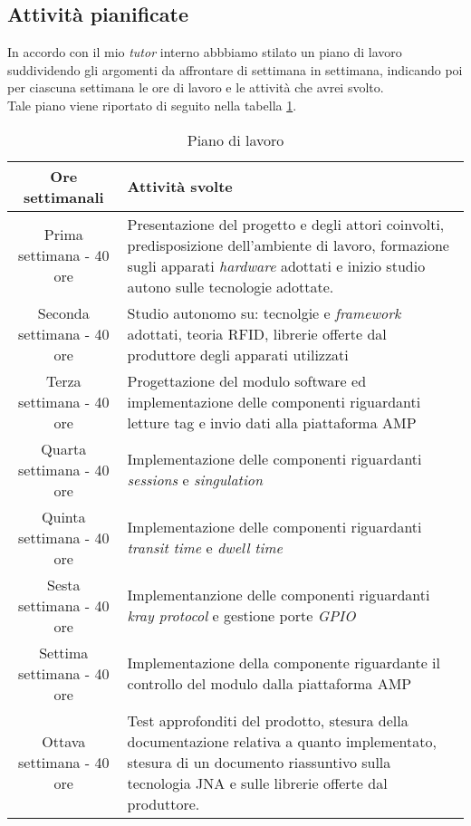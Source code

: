 \subsection{Attività pianificate}
In accordo con il mio \emph{tutor} interno abbbiamo stilato un piano di lavoro suddividendo gli argomenti da affrontare di settimana in settimana, indicando poi per ciascuna settimana
le ore di lavoro e le attività che avrei svolto. \\
Tale piano viene riportato di seguito nella tabella \ref{tab:piano-di-lavoro}.
\begin{table}[!h]
\begin{tabularx}{\textwidth}{|c|X|}
\hline
\textbf{Ore settimanali} & \textbf{Attività svolte}\\
\hline
Prima settimana - 40 ore & Presentazione del progetto e degli attori coinvolti, predisposizione dell’ambiente di lavoro, 
formazione sugli apparati \emph{hardware} adottati e inizio studio autono sulle tecnologie adottate. \\
\hline
Seconda settimana - 40 ore & Studio autonomo su: tecnolgie e \emph{framework} adottati, teoria RFID, librerie offerte dal produttore degli apparati utilizzati \\
\hline
Terza settimana - 40 ore & Progettazione del modulo software ed implementazione delle componenti riguardanti letture tag e invio dati alla piattaforma AMP\\
\hline
Quarta settimana - 40 ore & Implementazione delle componenti riguardanti \emph{sessions} e \emph{singulation}\\
\hline
Quinta settimana - 40 ore & Implementazione delle componenti riguardanti \emph{transit time} e \emph{dwell time}\\
\hline
Sesta settimana - 40 ore & Implementanzione delle componenti riguardanti \emph{kray protocol} e gestione porte \emph{GPIO} \\
\hline
Settima settimana - 40 ore & Implementazione della componente riguardante il controllo del modulo dalla piattaforma AMP\\
\hline
Ottava settimana - 40 ore & Test approfonditi del prodotto, stesura della documentazione relativa a quanto implementato, 
stesura di un documento riassuntivo sulla tecnologia JNA e sulle librerie offerte dal produttore.\\
\hline
\end{tabularx}
\caption{Piano di lavoro}
\label{tab:piano-di-lavoro}
\end{table}

